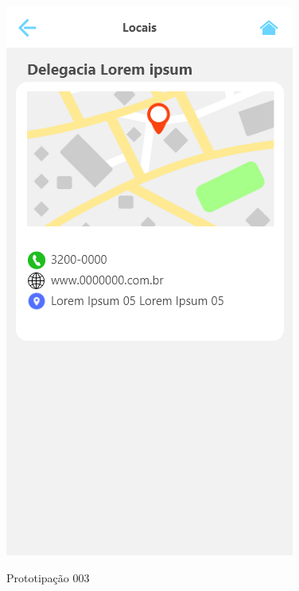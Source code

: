 \documentclass[
	12pt,				%
	openright,			%
	oneside,			%
	a4paper,			%
	english,			%
	brazil,				%
	]{abntex2}
\theoremstyle{theorem}
\theoremstyle{definition}
\begin{document}
\begin{figure}[H]
\begin{minipage}{.3\textwidth}
  \includegraphics[width=.9\linewidth]{imagens/prototipoLocal.png}
  \label{fig: Tela de detalhamento local}
\end{minipage}
\caption{Prototipação 003}
\end{figure}
%
%

\printindex
\end{document}
